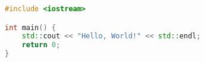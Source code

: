 \documentclass{article}
\begin{document}
\begin{lstlisting}[language=C++, caption=Example C++ code]
#include <iostream>

int main() {
    std::cout << "Hello, World!" << std::endl;
    return 0;
}
\end{lstlisting}
\end{document}

